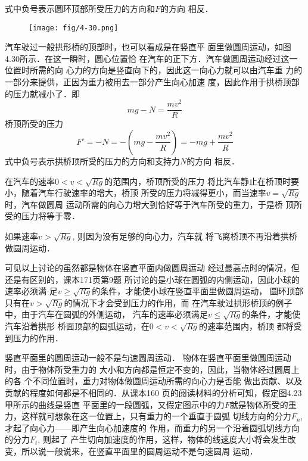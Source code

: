 式中负号表示圆环顶部所受压力的方向和$F$的方向
相反．

\begin{figure}[htp]
    \centering
    \texttt{[image: fig/4-30.png]}
    \caption{}
\end{figure}

汽车驶过一般拱形桥的顶部时，也可以看成是在竖直平
面里做圆周运动，如图4.30所示．在这一瞬时，圆心位置恰
在汽车的正下方．汽车做圆周运动经过这一位置时所需的向
心力的方向是竖直向下的，因此这一向心力就可以由汽车重
力的一部分来提供，正因为重力被用去一部分产生向心加速
度，因此作用于拱桥顶部的压力就减小了．即
\[mg-N=\frac{mv^2}{R}\]
桥顶所受的压力
\[F'=-N=-\left(mg-\frac{mv^2}{R}\right)=-mg+\frac{mv^2}{R}\]
式中负号表示拱桥顶所受的压力的方向和支持力$N$的方向
相反．

在汽车的速率$0<v<\sqrt{Rg}$的范围内，桥顶所受的压力
将比汽车静止在桥顶时要小，随着汽车行驶速率的增大，桥顶
所受的压力将减得更小，而当速率$v=\sqrt{Rg}$时，汽车做圆周
运动所需的向心力增大到恰好等于汽车所受的重力，于是桥
顶所受的压力将等于零．

如果速率$v>\sqrt{Rg}$, 则因为没有足够的向心力，汽车就
将飞离桥顶不再沿着拱桥做圆周运动．

可见以上讨论的虽然都是物体在竖直平面内做圆周运动
经过最高点时的情况，但还是有区别的，课本171页第9题
所讨论的是小球在圆弧的内侧运动，因此小球的速率必须满
足$v\ge \sqrt{Rg}$的条件，才能使小球在竖直平面里做圆周运动，
圆环顶部只有在$v>\sqrt{Rg}$的情况下才会受到压力的作用，而
在汽车驶过拱形桥顶的例子中，由于汽车在圆弧的外侧运动，
汽车的速率必须满足$v\le \sqrt{Rg}$的条件，才能使汽车沿着拱形
桥面顶部的圆弧运动，在$0<v<\sqrt{Rg}$的速率范围内，桥顶
都将受到压力的作用．

竖直平面里的圆周运动一般不是匀速圆周运动．
物体在竖直平面里做圆周运动时，由于物体所受重力的
大小和方向都是恒定不变的，因此，当物体经过圆周上的各
个不同位置时，重力对物体做圆周运动所需的向心力是否能
做出贡献、以及贡献的程度如何都是不相同的．从课本160
页的阅读材料的分析可知，假定图4.23甲所示的曲线是竖直
平面里的一段圆弧，又假定图示中的力$F$就是物体所受的重
力，这样就可想象在这一位置上，只有重力的一个垂直于圆弧
切线方向的分力$F_n$, 才起了向心力——即产生向心加速度的
作用，而重力的另一个沿着圆弧切线方向的分力$F_t$, 则起了
产生切向加速度的作用，这样，物体的线速度大小将会发生改
变，所以说一般说来，在竖直平面里的圆周运动不是匀速圆周
运动．

